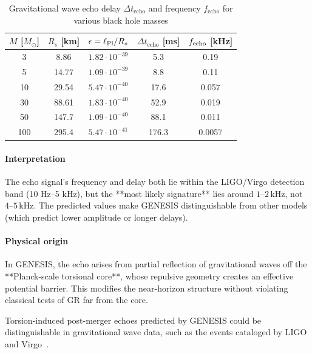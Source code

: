 \documentclass{article}
\begin{document}
\begin{table}[h!]
\centering
\renewcommand{\arraystretch}{1.2}
\caption{Gravitational wave echo delay $\Delta t_{\text{echo}}$ and frequency $f_{\text{echo}}$ for various black hole masses}
\label{tab:echo_delay}
\begin{tabular}{c|c|c|c|c}
\textbf{$M$ [$M_\odot$]} & \textbf{$R_s$ [km]} & \textbf{$\epsilon = \ell_{\rm Pl}/R_s$} & \textbf{$\Delta t_{\text{echo}}$ [ms]} & \textbf{$f_{\rm echo}$ [kHz]} \\
\hline
3   & 8.86   & $1.82 \cdot 10^{-39}$ & 5.3   & 0.19 \\
5   & 14.77  & $1.09 \cdot 10^{-39}$ & 8.8   & 0.11 \\
10  & 29.54  & $5.47 \cdot 10^{-40}$ & 17.6  & 0.057 \\
30  & 88.61  & $1.83 \cdot 10^{-40}$ & 52.9  & 0.019 \\
50  & 147.7  & $1.09 \cdot 10^{-40}$ & 88.1  & 0.011 \\
100 & 295.4  & $5.47 \cdot 10^{-41}$ & 176.3 & 0.0057 \\
\end{tabular}
\end{table}


\paragraph{Interpretation}

The echo signal’s frequency and delay both lie within the LIGO/Virgo detection band (10 Hz–5 kHz), but the **most likely signature** lies around \(1\text{–}2\,\mathrm{kHz}\), not \(4\text{–}5\,\mathrm{kHz}\). The predicted values make GENESIS distinguishable from other models (which predict lower amplitude or longer delays).

\paragraph{Physical origin}

In GENESIS, the echo arises from partial reflection of gravitational waves off the **Planck-scale torsional core**, whose repulsive geometry creates an effective potential barrier. This modifies the near-horizon structure without violating classical tests of GR far from the core.

Torsion-induced post-merger echoes predicted by GENESIS could be distinguishable in gravitational wave data, such as the events cataloged by LIGO and Virgo~\cite{ligo2019}.
\end{document}

